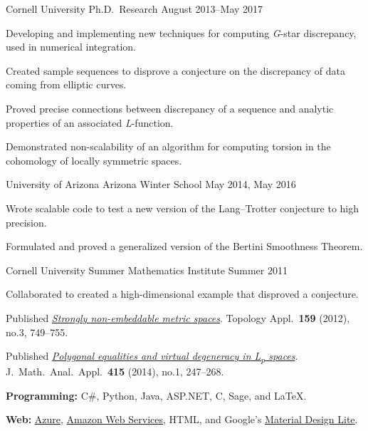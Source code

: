 \documentclass[11pt, letterpaper]{awesome-cv}
\begin{document}

\begin{cventries}

\cventry
	{Cornell University}
	{Ph.D.~Research}
	{}
	{August 2013--May 2017}
	{
		\begin{cvitems}
			\item{Developing and implementing new techniques for computing \emph{G}-star discrepancy, used in numerical integration.}
			\item{Created sample sequences to disprove a conjecture on the discrepancy of data coming from elliptic curves.}
			\item{Proved precise connections between discrepancy of a sequence and analytic properties of an associated \emph{L}-function.}
			\item{Demonstrated non-scalability of an algorithm for computing torsion in the cohomology of locally symmetric spaces.}
		\end{cvitems}
	}
		
\cventry
	{University of Arizona}
	{Arizona Winter School}
	{}
	{May 2014, May 2016}
	{
		\begin{cvitems}
			\item{Wrote scalable code to test a new version of the Lang--Trotter conjecture to high precision.}
			\item{Formulated and proved a generalized version of the Bertini Smoothness Theorem.}
		\end{cvitems}
	}
	
\cventry
	{Cornell University}
	{Summer Mathematics Institute}
	{}
	{Summer 2011}
	{
		\begin{cvitems}
			\item{Collaborated to created a high-dimensional example that disproved a conjecture.}
			\item{Published \href{http://dx.doi.org/10.1016/j.topol.2011.11.041}{\emph{Strongly non-embeddable metric spaces}}. Topology Appl.~\textbf{159} (2012), no.3, 749--755.}
			\item{Published \href{http://dx.doi.org/10.1016/j.jmaa.2014.01.063}{\emph{Polygonal equalities and virtual degeneracy in L\textsubscript{p} spaces}}. J.~Math.~Anal.~Appl.~\textbf{415} (2014), no.1, 247--268.}
		\end{cvitems}
	}
\end{cventries}






\begin{cvparagraph}
\textbf{Programming:} C\#, Python, Java, ASP.NET, C, Sage, and \LaTeX.

\textbf{Web:} \href{https://azure.microsoft.com/}{Azure}, \href{https://aws.amazon.com/}{Amazon Web Services}, HTML, and Google's \href{https://getmdl.io/}{Material Design Lite}.
\end{cvparagraph}
\end{document}

